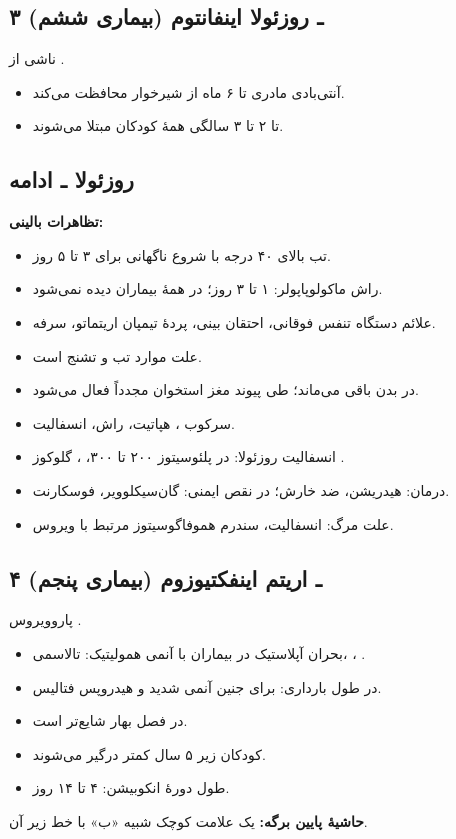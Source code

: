 \documentclass[12pt,a4paper]{article}
\begin{document}
\subsection*{۳ ـ روزئولا اینفانتوم (بیماری ششم)}
ناشی از .
\begin{itemize}
\item آنتی‌بادی مادری تا ۶ ماه از شیرخوار محافظت می‌کند.
\item تا ۲ تا ۳ سالگی همهٔ کودکان مبتلا می‌شوند.
\end{itemize}

\subsection*{روزئولا ـ ادامه}
\textbf{تظاهرات بالینی:}
\begin{itemize}
\item تب بالای ۴۰ درجه با شروع ناگهانی برای ۳ تا ۵ روز.
\item راش ماکولوپاپولر: ۱ تا ۳ روز؛ در همهٔ بیماران دیده نمی‌شود.
\item علائم دستگاه تنفس فوقانی، احتقان بینی، پردهٔ تیمپان اریتماتو، سرفه.
\item علت  موارد تب و تشنج است.
\end{itemize}
\begin{itemize}
\item در بدن باقی می‌ماند؛ طی پیوند مغز استخوان مجدداً فعال می‌شود.
\item سرکوب ، هپاتیت، راش، انسفالیت.
\item انسفالیت روزئولا: در  پلئوسیتوز ۲۰۰ تا ۳۰۰، \FRmath{\uparrow}، گلوکوز .
\item درمان: هیدریشن، ضد خارش؛ در نقص ایمنی: گان‌سیکلوویر، فوسکارنت.
\item علت مرگ: انسفالیت، سندرم هموفاگوسیتوز مرتبط با ویروس.
\end{itemize}

\subsection*{۴ ـ اریتم اینفکتیوزوم (بیماری پنجم)}
پاروویروس .
\begin{itemize}
\item بحران آپلاستیک در بیماران با آنمی همولیتیک: تالاسمی، ، .
\item در طول بارداری: برای جنین آنمی شدید و هیدروپس فتالیس.
\item در فصل بهار شایع‌تر است.
\item کودکان زیر ۵ سال کمتر درگیر می‌شوند.
\item طول دورهٔ انکوبیشن: ۴ تا ۱۴ روز.
\end{itemize}
\textbf{حاشیهٔ پایین برگه:} یک علامت کوچک شبیه «ب» با خط زیر آن.
\end{document}
